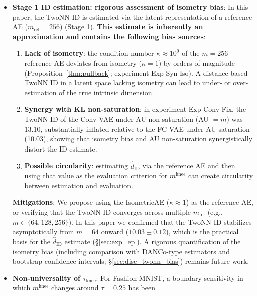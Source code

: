 \documentclass[make,article,submit,pdftex,moreauthors]{Definitions/mdpi}
\newcommand{\kap}{\kappa}
\newcommand{\mknee}{m^{\mathrm{knee}}}
\begin{document}
\begin{itemize}
  \item \textbf{Stage 1 ID estimation: rigorous assessment of isometry bias}:
        In this paper, the TwoNN ID is estimated via the latent representation of a
        reference AE ($m_\mathrm{ref}=256$) (Stage 1).
        \textbf{This estimate is inherently an approximation and contains the following
        bias sources}:
        \begin{enumerate}[label=(\roman*)]
          \item \textbf{Lack of isometry}: the condition number $\kap \approx 10^9$ of
                the $m=256$ reference AE deviates from isometry ($\kap=1$) by orders of
                magnitude (Proposition~\ref{thm:pullback}; experiment Exp-Syn-Iso).
                A distance-based TwoNN ID in a latent space lacking isometry can lead
                to under- or over-estimation of the true intrinsic dimension.
          \item \textbf{Synergy with KL non-saturation}: in experiment Exp-Conv-Fix, the
                TwoNN ID of the Conv-VAE under AU non-saturation (AU $=m$) was 13.10,
                substantially inflated relative to the FC-VAE under AU saturation
                (10.03), showing that isometry bias and AU non-saturation synergistically
                distort the ID estimate.
          \item \textbf{Possible circularity}: estimating $\hat{d}_\mathrm{ID}$ via the
                reference AE and then using that value as the evaluation criterion for
                $\mknee$ can create circularity between estimation and evaluation.
        \end{enumerate}
        \textbf{Mitigations}: We propose using the IsometricAE ($\kap \approx 1$) as
        the reference AE, or verifying that the TwoNN ID converges across multiple
        $m_\mathrm{ref}$ (e.g., $m \in \{64, 128, 256\}$).
        In this paper we confirmed that the TwoNN ID stabilizes asymptotically from
        $m=64$ onward ($10.03 \pm 0.12$), which is the practical basis for the
        $\hat{d}_\mathrm{ID}$ estimate (\S\ref{sec:exp_ep}).
        A rigorous quantification of the isometry bias (including comparison with
        DANCo-type estimators and bootstrap confidence intervals;
        \S\ref{sec:disc_twonn_bias}) remains future work.
  \item \textbf{Non-universality of $\tau_{\mathrm{knee}}$}: For Fashion-MNIST, a
        boundary sensitivity in which $\mknee$ changes around $\tau = 0.25$ has been

\end{itemize}
\end{document}
